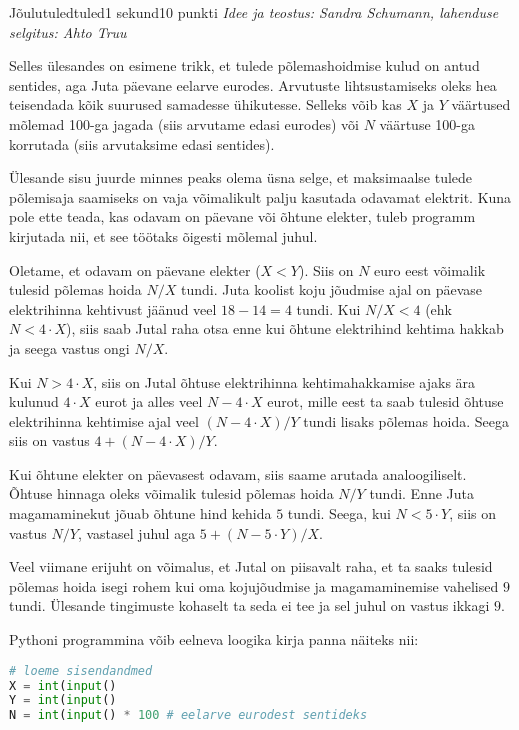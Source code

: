\begin{yl}{1}{Jõulutuled}{tuled}{1 sekund}{10 punkti}
  \emph{Idee ja teostus: Sandra Schumann, lahenduse selgitus: Ahto Truu}

  Selles ülesandes on esimene trikk, et tulede põlemashoidmise kulud on antud sentides, aga Juta päevane eelarve eurodes. Arvutuste lihtsustamiseks oleks hea teisendada kõik suurused samadesse ühikutesse. Selleks võib kas $X$ ja $Y$ väärtused mõlemad 100-ga jagada (siis arvutame edasi eurodes) või $N$ väärtuse 100-ga korrutada (siis arvutaksime edasi sentides).

  Ülesande sisu juurde minnes peaks olema üsna selge, et maksimaalse tulede põlemisaja saamiseks on vaja võimalikult palju kasutada odavamat elektrit. Kuna pole ette teada, kas odavam on päevane või õhtune elekter, tuleb programm kirjutada nii, et see töötaks õigesti mõlemal juhul.

  Oletame, et odavam on päevane elekter ($X < Y$). Siis on $N$ euro eest võimalik tulesid põlemas hoida $N / X$ tundi. Juta koolist koju jõudmise ajal on päevase elektrihinna kehtivust jäänud veel $18 - 14 = 4$ tundi. Kui $N / X < 4$ (ehk $N < 4 \cdot X$), siis saab Jutal raha otsa enne kui õhtune elektrihind kehtima hakkab ja seega vastus ongi $N / X$.
  
  Kui $N > 4 \cdot X$, siis on Jutal õhtuse elektrihinna kehtimahakkamise ajaks ära kulunud $4 \cdot X$ eurot ja alles veel $N - 4 \cdot X$ eurot, mille eest ta saab tulesid õhtuse elektrihinna kehtimise ajal veel $(N - 4 \cdot X) / Y$ tundi lisaks põlemas hoida. Seega siis on vastus $4 + (N - 4 \cdot X) / Y$.

  Kui õhtune elekter on päevasest odavam, siis saame arutada analoogiliselt. Õhtuse hinnaga oleks võimalik tulesid põlemas hoida $N / Y$ tundi. Enne Juta magamaminekut jõuab õhtune hind kehida $5$ tundi. Seega, kui $N < 5 \cdot Y$, siis on vastus $N / Y$, vastasel juhul aga $5 + (N - 5 \cdot Y) / X$.

  Veel viimane erijuht on võimalus, et Jutal on piisavalt raha, et ta saaks tulesid põlemas hoida isegi rohem kui oma kojujõudmise ja magamaminemise vahelised $9$ tundi. Ülesande tingimuste kohaselt ta seda ei tee ja sel juhul on vastus ikkagi $9$.

  Pythoni programmina võib eelneva loogika kirja panna näiteks nii:
\begin{lstlisting}[language=Python]
# loeme sisendandmed
X = int(input()
Y = int(input()
N = int(input() * 100 # eelarve eurodest sentideks


\end{lstlisting}
\end{yl}
